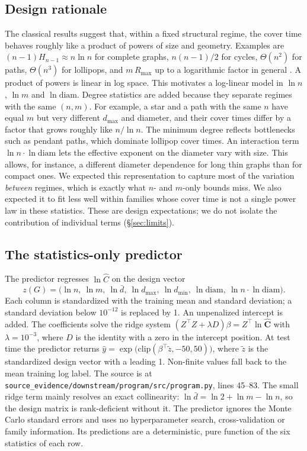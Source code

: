 \documentclass{article}
\newcommand{\Ccov}{C}
\newcommand{\diam}{\mathrm{diam}}
\begin{document}
\subsection{Design rationale}
\label{sec:rationale}
The classical results suggest that, within a fixed structural regime, the cover time behaves roughly like a product of powers of size and geometry. Examples are $(n-1)H_{n-1}\approx n\ln n$ for complete graphs, $n(n-1)/2$ for cycles, $\Theta(n^2)$ for paths, $\Theta(n^3)$ for lollipops, and $m\,R_{\max}$ up to a logarithmic factor in general \citep{Feige1995ATL,Chandra1989TheER,Lovász2001RandomWO}. A product of powers is linear in log space. This motivates a log-linear model in $\ln n$, $\ln m$ and $\ln \diam$. Degree statistics are added because they separate regimes with the same $(n,m)$. For example, a star and a path with the same $n$ have equal $m$ but very different $d_{\max}$ and diameter, and their cover times differ by a factor that grows roughly like $n/\ln n$. The minimum degree reflects bottlenecks such as pendant paths, which dominate lollipop cover times. An interaction term $\ln n\cdot\ln\diam$ lets the effective exponent on the diameter vary with size. This allows, for instance, a different diameter dependence for long thin graphs than for compact ones. We expected this representation to capture most of the variation \emph{between} regimes, which is exactly what $n$- and $m$-only bounds miss. We also expected it to fit less well within families whose cover time is not a single power law in these statistics. These are design expectations; we do not isolate the contribution of individual terms (\S\ref{sec:limits}).

\subsection{The statistics-only predictor}
\label{sec:predictor}
The predictor regresses $\ln \hat \Ccov$ on the design vector
\begin{equation}
z(G) = \bigl(\ln n,\ \ln m,\ \ln \bar d,\ \ln d_{\max},\ \ln d_{\min},\ \ln \diam,\ \ln n\cdot\ln \diam\bigr).
\end{equation}
Each column is standardized with the training mean and standard deviation; a standard deviation below $10^{-12}$ is replaced by 1. An unpenalized intercept is added. The coefficients solve the ridge system $(Z^\top Z+\lambda D)\beta = Z^\top \ln \hat{\mathbf C}$ with $\lambda=10^{-3}$, where $D$ is the identity with a zero in the intercept position. At test time the predictor returns $\hat y = \exp\bigl(\mathrm{clip}(\beta^\top \tilde z, -50, 50)\bigr)$, where $\tilde z$ is the standardized design vector with a leading 1. Non-finite values fall back to the mean training log label. The source is at \texttt{source\_evidence/downstream/program/src/program.py}, lines 45--83. The small ridge term mainly resolves an exact collinearity: $\ln\bar d = \ln 2 + \ln m - \ln n$, so the design matrix is rank-deficient without it. The predictor ignores the Monte Carlo standard errors and uses no hyperparameter search, cross-validation or family information. Its predictions are a deterministic, pure function of the six statistics of each row.
\end{document}
